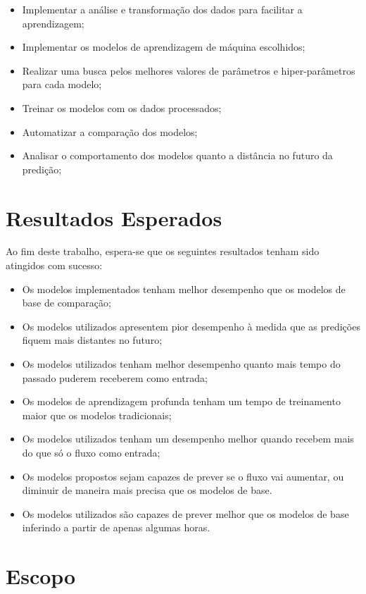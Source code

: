\begin{itemize}
    \item Implementar a análise e transformação dos dados para facilitar a aprendizagem;
    \item Implementar os modelos de aprendizagem de máquina escolhidos; 
    \item Realizar uma busca pelos melhores valores de parâmetros e hiper-parâmetros para cada modelo;
    \item Treinar os modelos com os dados processados;
    \item Automatizar a comparação dos modelos;
    \item Analisar o comportamento dos modelos quanto a distância no futuro da predição;
\end{itemize}

\section{Resultados Esperados} 

Ao fim deste trabalho, espera-se que os seguintes resultados tenham sido atingidos com sucesso:

\begin{itemize}
    \item  Os modelos implementados tenham melhor desempenho que os modelos de base de comparação;
    \item Os modelos utilizados apresentem pior desempenho à medida que as predições fiquem mais distantes no futuro;
    \item Os modelos utilizados tenham melhor desempenho quanto mais tempo do passado puderem receberem como entrada;
    \item Os modelos de aprendizagem profunda tenham um tempo de treinamento maior que os modelos tradicionais;
    \item Os modelos utilizados tenham um desempenho melhor quando recebem mais do que só o fluxo como entrada;
    \item Os modelos propostos sejam capazes de prever se o fluxo vai aumentar, ou diminuir de maneira mais precisa que os modelos de base.
    \item Os modelos utilizados são capazes de prever melhor que os modelos de base inferindo a partir de apenas algumas horas.
\end{itemize}

\section{Escopo}

